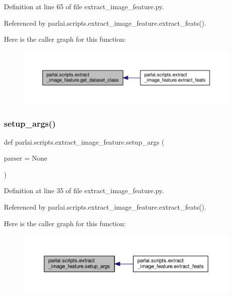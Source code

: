 Definition at line 65 of file extract\+\_\+image\+\_\+feature.\+py.



Referenced by parlai.\+scripts.\+extract\+\_\+image\+\_\+feature.\+extract\+\_\+feats().

Here is the caller graph for this function\+:
\nopagebreak
\begin{figure}[H]
\begin{center}
\leavevmode
\includegraphics[width=350pt]{namespaceparlai_1_1scripts_1_1extract__image__feature_a4fa5d8aef45056034f4898531a0f9967_icgraph}
\end{center}
\end{figure}
\mbox{\label{namespaceparlai_1_1scripts_1_1extract__image__feature_ab634fcc65758e30deaf92980edcc20bd}} 
\subsubsection{\texorpdfstring{setup\+\_\+args()}{setup\_args()}}
{\footnotesize\ttfamily def parlai.\+scripts.\+extract\+\_\+image\+\_\+feature.\+setup\+\_\+args (\begin{DoxyParamCaption}\item[{}]{parser = {\ttfamily None} }\end{DoxyParamCaption})}



Definition at line 35 of file extract\+\_\+image\+\_\+feature.\+py.



Referenced by parlai.\+scripts.\+extract\+\_\+image\+\_\+feature.\+extract\+\_\+feats().

Here is the caller graph for this function\+:
\nopagebreak
\begin{figure}[H]
\begin{center}
\leavevmode
\includegraphics[width=350pt]{namespaceparlai_1_1scripts_1_1extract__image__feature_ab634fcc65758e30deaf92980edcc20bd_icgraph}
\end{center}
\end{figure}
